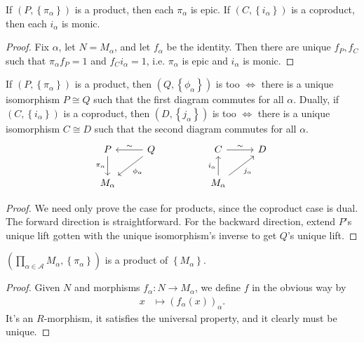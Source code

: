 \documentclass[twoside,10pt]{report}
\begin{document}
\begin{prop}
	If $(P, \left\{ \pi_{\alpha} \right\})$ is a product, then each $\pi_{\alpha}$ is epic. If $(C, \left\{ i_{\alpha} \right\})$ is a coproduct, then each $i_{\alpha}$ is monic.
\end{prop}
\begin{proof}
	Fix $\alpha$, let $N=M_{\alpha}$, and let $f_{\alpha}$ be the identity. Then there are unique $f_{P}, f_{C}$ such that $\pi_{\alpha}f_P=1$ and $f_C i_{\alpha}=1$, i.e. $\pi_{\alpha}$ is epic and $i_{\alpha}$ is monic.
\end{proof}

\begin{thrm}[Uniqueness]
	If $(P, \left\{ \pi_{\alpha} \right\})$ is a product, then $(Q, \left\{ \phi_{\alpha} \right\})$ is too $\iff$ there is a unique isomorphism $P \cong Q$ such that the first diagram commutes for all $\alpha$. Dually, if $(C, \left\{ i_{\alpha} \right\})$ is a coproduct, then $(D, \left\{ j_{\alpha} \right\})$ is too $\iff$ there is a unique isomorphism $C \cong D$ such that the second diagram commutes for all $\alpha$.
	\[
	\begin{tikzcd}
		P \dar["\pi_{\alpha}"'] & Q \lar["\sim"']\arrow[dl,"\phi_{\alpha}"] & & C \rar{\sim} & D \\
		M_{\alpha} & & & M_{\alpha} \uar{i_{\alpha}}\arrow[ur, "j_{\alpha}"']
	\end{tikzcd}
	\] 
\end{thrm}
\begin{proof}
	We need only prove the case for products, since the coproduct case is dual. The forward direction is straightforward. For the backward direction, extend $P$'s unique lift gotten with the unique isomorphism's inverse to get $Q$'s unique lift.
\end{proof}

\begin{thrm}[Existence]
	$\left(\prod_{\alpha \in \mathcal{A}} M_{\alpha}, \left\{ \pi_{\alpha} \right\}\right)$ is a product of $\left\{ M_{\alpha} \right\}$.
\end{thrm}
\begin{proof}
	Given $N$ and morphisms $f_{\alpha}:N\to M_{\alpha}$, we define $f$ in the obvious way by
	\begin{align*}
		x &\mapsto (f_{\alpha}(x))_{\alpha}.
	\end{align*}
	It's an $R$-morphism, it satisfies the universal property, and it clearly must be unique.
\end{proof}
\end{document}
